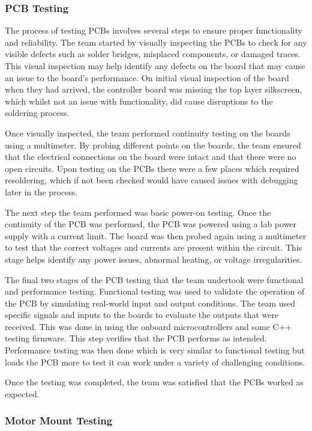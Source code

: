 \documentclass [12pt]{article}
\begin{document}
\subsubsection{PCB Testing}

The process of testing PCBs involves several steps to ensure proper functionality and reliability. The team started by visually inspecting the PCBs to check for any visible defects such as solder bridges, misplaced components, or damaged traces. This visual inspection may help identify any defects on the board that may cause an issue to the board’s performance. On initial visual inspection of the board when they had arrived, the controller board was missing the top layer silkscreen, which whilst not an issue with functionality, did cause disruptions to the soldering process. 

Once visually inspected, the team performed continuity testing on the boards using a multimeter. By probing different points on the boards, the team ensured that the electrical connections on the board were intact and that there were no open circuits.  Upon testing on the PCBs there were a few places which required resoldering, which if not been checked would have caused issues with debugging later in the process. 

The next step the team performed was basic power-on testing. Once the continuity of the PCB was performed, the PCB was powered using a lab power supply with a current limit. The board was then probed again using a multimeter to test that the correct voltages and currents are present within the circuit. This stage helps identify any power issues, abnormal heating, or voltage irregularities. 

The final two stages of the PCB testing that the team undertook were functional and performance testing. Functional testing was used to validate the operation of the PCB by simulating real-world input and output conditions. The team used specific signals and inputs to the boards to evaluate the outputs that were received. This was done in using the onboard microcontrollers and some C++ testing firmware. This step verifies that the PCB performs as intended. Performance testing was then done which is very similar to functional testing but loads the PCB more to test it can work under a variety of challenging conditions. 

Once the testing was completed, the team was satisfied that the PCBs worked as expected. 


\subsubsection{Motor Mount Testing}
\end{document}
